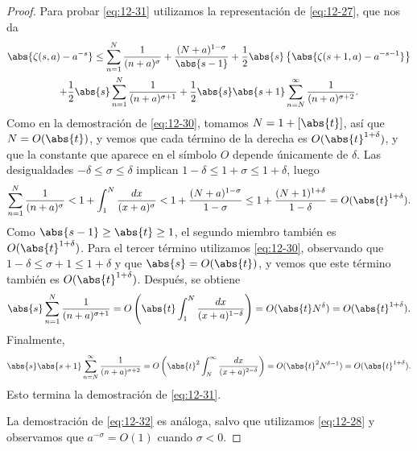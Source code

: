 \documentclass[12pt,a4paper]{book}
\begin{document}
\begin{proof}
        Para probar \eqref{eq:12-31} utilizamos la representación de \eqref{eq:12-27}, que nos
        da
        \begin{multline*}
            \abs{\zeta(s,a)-a^{-s}}\leq\sum_{n=1}^{N}\frac{1}{(n+a)^{\sigma}}+\frac{(N+a)^{1-\sigma}}{\abs{s-1}}+\frac{1}{2}\abs{s}\left\{\abs{\zeta(s+1,a)-a^{-s-1}}\right\}\\
            +\frac{1}{2}\abs{s}\sum_{n=1}^{N}\frac{1}{(n+a)^{\sigma+1}}+\frac{1}{2}\abs{s}\abs{s+1}\sum_{n=N}^{\infty}\frac{1}{(n+a)^{\sigma+2}}.
        \end{multline*}
        Como en la demostración de \eqref{eq:12-30}, tomamos $N=1+[\abs{t}]$, así que
        $N=O(\abs{t})$, y vemos que cada término de la derecha es $O(\abs{t}^{1+\delta})$, y
        que la constante que aparece en el símbolo $O$ depende únicamente de $\delta$. Las
        desigualdades $-\delta\leq\sigma\leq\delta$ implican $1-\delta\leq1+\sigma\leq1+\delta$,
        luego
        \begin{equation*}
            \sum_{n=1}^{N}\frac{1}{(n+a)^{\sigma}}<1+\int_{1}^{N}\frac{dx}{(x+a)^{\sigma}}<1+\frac{(N+a)^{1-\sigma}}{1-\sigma}\leq1+\frac{(N+1)^{1+\delta}}{1-\delta}=O(\abs{t}^{1+\delta}).
        \end{equation*}
        Como $\abs{s-1}\geq\abs{t}\geq1$, el segundo miembro también es $O(\abs{t}^{1+\delta})$.
        Para el tercer término utilizamos \eqref{eq:12-30}, observando que
        $1-\delta\leq\sigma+1\leq1+\delta$ y que $\abs{s}=O(\abs{t})$, y vemos que este
        término también es $O(\abs{t}^{1+\delta})$. Después, se obtiene
        \begin{equation*}
            \abs{s}\sum_{n=1}^{N}\frac{1}{(n+a)^{\sigma+1}}=O\left(\abs{t}\int_{1}^{N}\frac{dx}{(x+a)^{1-\delta}}\right)=O(\abs{t}N^{\delta})=O(\abs{t}^{1+\delta}).
        \end{equation*}
        Finalmente,
        \begin{equation*}
            \abs{s}\abs{s+1}\sum_{n=N}^{\infty}\frac{1}{(n+a)^{\sigma+2}}=O\left(\abs{t}^{2}\int_{N}^{\infty}\frac{dx}{(x+a)^{2-\delta}}\right)=O(\abs{t}^{2}N^{\delta-1})=O(\abs{t}^{1+\delta}).
        \end{equation*}
        Esto termina la demostración de \eqref{eq:12-31}.

        La demostración de \eqref{eq:12-32} es análoga, salvo que utilizamos \eqref{eq:12-28} y
        observamos que $a^{-\sigma}=O(1)$ cuando $\sigma<0$.
    \end{proof}
\end{document}
